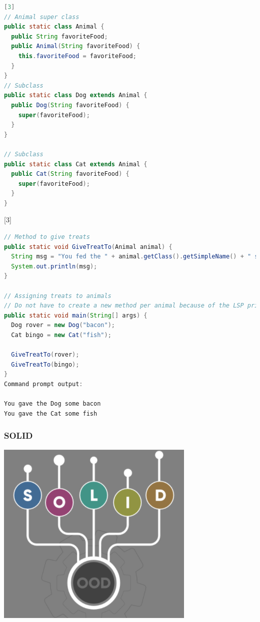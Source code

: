 \documentclass{beamer}
\begin{document}

\vspace{5mm}

\begin{lstlisting}[language=Java]
[3]
// Animal super class 
public static class Animal {
  public String favoriteFood;
  public Animal(String favoriteFood) {
    this.favoriteFood = favoriteFood;
  }
}
// Subclass
public static class Dog extends Animal {
  public Dog(String favoriteFood) {
    super(favoriteFood);
  }
}

// Subclass
public static class Cat extends Animal {
  public Cat(String favoriteFood) {
    super(favoriteFood);
  }
}
\end{lstlisting}

\vspace{5mm}



\vspace{5mm}
[3]
\begin{lstlisting}[language=Java]
// Method to give treats
public static void GiveTreatTo(Animal animal) {
  String msg = "You fed the " + animal.getClass().getSimpleName() + " some "  + animal.favoriteFood;
  System.out.println(msg);
}

// Assigning treats to animals
// Do not have to create a new method per animal because of the LSP principle
public static void main(String[] args) {
  Dog rover = new Dog("bacon");
  Cat bingo = new Cat("fish");

  GiveTreatTo(rover);
  GiveTreatTo(bingo);
}
Command prompt output:

You gave the Dog some bacon
You gave the Cat some fish
\end{lstlisting}


\begin{frame}
\frametitle{SOLID} 
\includegraphics[scale=0.8]{SOLID}
\centering


\end{frame}
\end{document}

